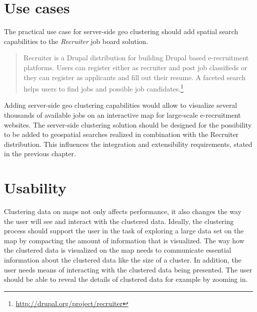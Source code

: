 \section{Use cases}
\label{chapter:objective-use-cases}

The practical use case for server-side geo clustering should add spatial search capabilities to the \textit{Recruiter} job board solution.

\begin{quote}
Recruiter is a Drupal distribution for building Drupal based e-recruitment platforms. Users can register either as recruiter and post job classifieds or they can register as applicants and fill out their resume. A faceted search helps users to find jobs and possible job candidates.\footnote{\url{http://drupal.org/project/recruiter}}
\end{quote}

Adding server-side geo clustering capabilities would allow to visualize several thousands of available jobs on an interactive map for large-scale e-recruitment websites. The server-side clustering solution should be designed for the possibility to be added to geospatial searches realized in combination with the Recruiter distribution. This influences the integration and extensibility requirements, stated in the previous chapter.

\section{Usability}
\label{chapter:objective-usability}

Clustering data on maps not only affects performance, it also changes the way the user will see and interact with the clustered data. Ideally, the clustering process should support the user in the task of exploring a large data set on the map by compacting the amount of information that is visualized. The way how the clustered data is visualized on the map needs to communicate essential information about the clustered data like the size of a cluster. In addition, the user needs means of interacting with the clustered data being presented. The user should be able to reveal the details of clustered data for example by zooming in. 

















